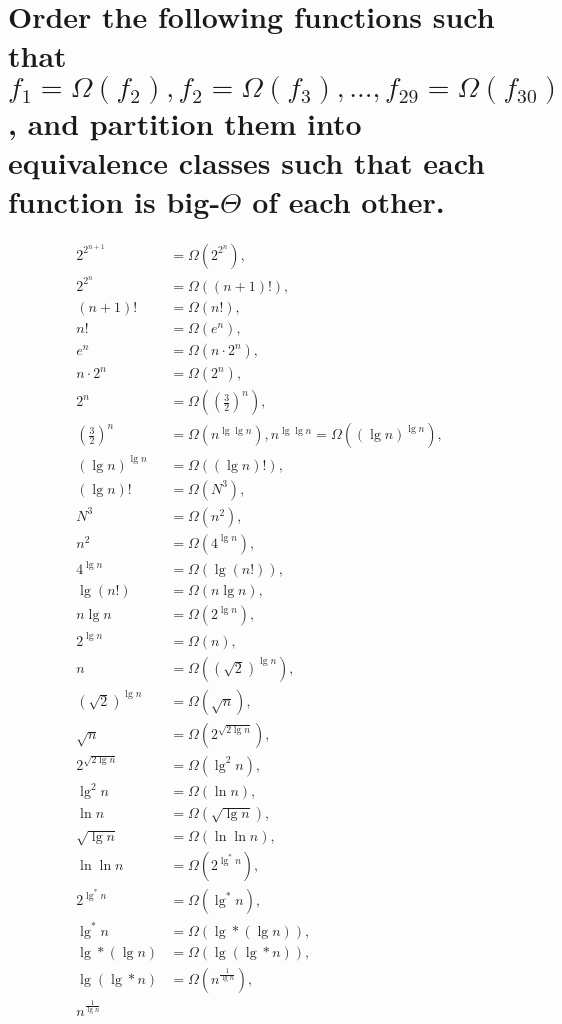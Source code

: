 \section[Problem 6]{Order the following functions such that $f_1 = \Omega(f_2), f_2 = \Omega(f_3), ..., f_{29} = \Omega(f_{30})$, and partition them into equivalence classes such that each function is big-$\Theta$ of each other.}

\begin{align*}
	2^{2^{n + 1}} &= \Omega(2^{2^n}), \\
	2^{2^n} &= \Omega((n + 1)!), \\
	(n + 1)! &= \Omega(n!), \\
	n! &= \Omega(e^n), \\
	e^n &= \Omega(n \cdot 2^n), \\
	n \cdot 2^n &= \Omega(2^n), \\
	2^n &= \Omega(\left( \frac{3}{2} \right)^n), \\
	\left( \frac{3}{2} \right)^n &= \Omega(n^{\lg \lg n}), n^{\lg \lg n} = \Omega(\left( \lg n \right)^{\lg n}), \\
	\left( \lg n \right)^{\lg n} &= \Omega((\lg n)!), \\
	(\lg n)! &= \Omega(N^3), \\
	N^3 &= \Omega(n^2), \\
	n^2 &= \Omega(4^{\lg n}), \\
	4^{\lg n} &= \Omega(\lg (n!)), \\
	\lg (n!) &= \Omega(n \lg n), \\
	n \lg n &= \Omega(2^{\lg n}), \\
	2^{\lg n} &= \Omega(n), \\
	n &= \Omega(\left( \sqrt{2} \right)^{\lg n}), \\
	\left( \sqrt{2} \right)^{\lg n} &= \Omega(\sqrt{n}), \\
	\sqrt{n} &= \Omega(2^{\sqrt{2 \lg n}}), \\
	2^{\sqrt{2 \lg n}} &= \Omega(\lg ^2 n), \\
	\lg ^2 n &= \Omega(\ln n), \\
	\ln n &= \Omega(\sqrt{\lg n}), \\
	\sqrt{\lg n} &= \Omega(\ln \ln n), \\
	\ln \ln n &= \Omega(2^{\lg ^* n}), \\
	2^{\lg ^* n} &= \Omega(\lg ^* n), \\
	\lg ^* n &= \Omega(\lg * (\lg n)), \\
	\lg * (\lg n) &= \Omega(\lg (\lg * n)), \\
	\lg (\lg * n) &= \Omega(n^{\frac{1}{\lg n}}), \\
	n^{\frac{1}{\lg n}}
\end{align*}
